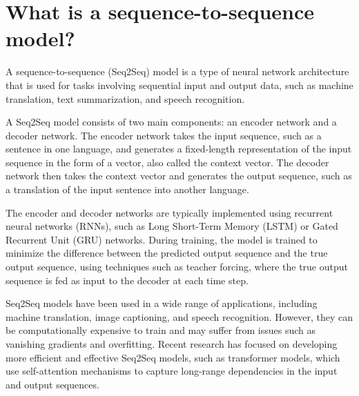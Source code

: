 \section{What is a sequence-to-sequence model?}
A sequence-to-sequence (Seq2Seq) model is a type of neural network architecture that is used for tasks involving sequential input and output data, such as machine translation, text summarization, and speech recognition.

A Seq2Seq model consists of two main components: an encoder network and a decoder network. The encoder network takes the input sequence, such as a sentence in one language, and generates a fixed-length representation of the input sequence in the form of a vector, also called the context vector. The decoder network then takes the context vector and generates the output sequence, such as a translation of the input sentence into another language.

The encoder and decoder networks are typically implemented using recurrent neural networks (RNNs), such as Long Short-Term Memory (LSTM) or Gated Recurrent Unit (GRU) networks. During training, the model is trained to minimize the difference between the predicted output sequence and the true output sequence, using techniques such as teacher forcing, where the true output sequence is fed as input to the decoder at each time step.

Seq2Seq models have been used in a wide range of applications, including machine translation, image captioning, and speech recognition. However, they can be computationally expensive to train and may suffer from issues such as vanishing gradients and overfitting. Recent research has focused on developing more efficient and effective Seq2Seq models, such as transformer models, which use self-attention mechanisms to capture long-range dependencies in the input and output sequences.

